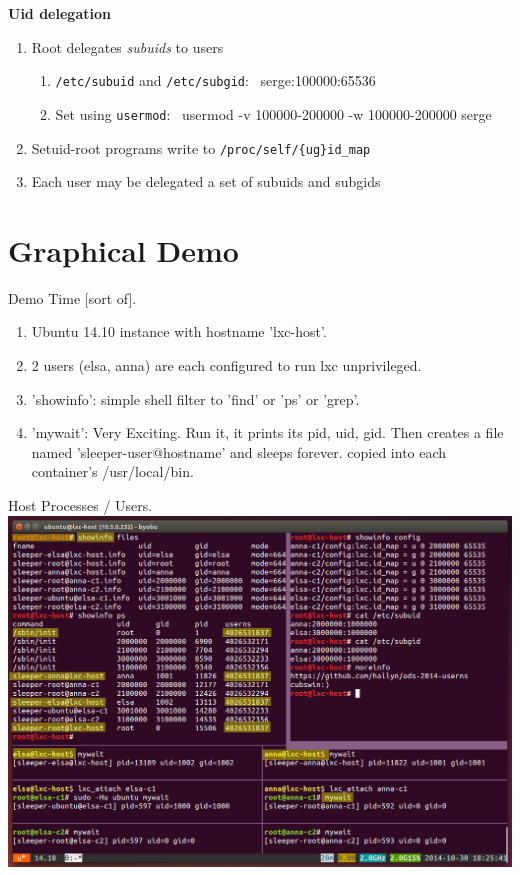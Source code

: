\documentclass{beamer}
\begin{document}
\begin{frame}
\textbf{Uid delegation}
\begin{enumerate}
\item Root delegates {\em subuids} to users
	\begin{enumerate}
	\item {\tt /etc/subuid} and {\tt /etc/subgid}: \
serge:100000:65536
	\item Set using {\tt usermod}: \
usermod -v 100000-200000 -w 100000-200000 serge
	\end{enumerate}
\item Setuid-root programs write to {\tt /proc/self/\{ug\}id\_map}
\item Each user may be delegated a set of subuids and subgids
\end{enumerate}
\end{frame}


\section{Graphical Demo}
\begin{frame}
Demo Time [sort of].
\begin{enumerate}
   \item Ubuntu 14.10 instance with hostname 'lxc-host'.
   \item 2 users (elsa, anna) are each configured to run lxc unprivileged.
   \item 'showinfo': simple shell filter to 'find' or 'ps' or 'grep'.
   \item 'mywait': Very Exciting. Run it, it prints its pid, uid, gid.  Then creates a file named 'sleeper-user@hostname' and sleeps forever. copied into each container's /usr/local/bin.
\end{enumerate}
\end{frame}

\begin{frame}
Host Processes / Users.
\includegraphics[width=\textwidth]{screen-host-info.png}
\end{frame}
\end{document}
